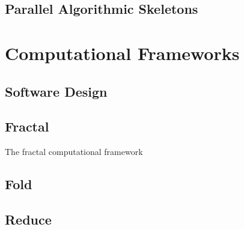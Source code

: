 \subsection{Parallel Algorithmic Skeletons}

\section{Computational Frameworks}

\subsection{Software Design}

\subsection{Fractal}
\quad The fractal computational framework



\subsection{Fold}

\subsection{Reduce}

